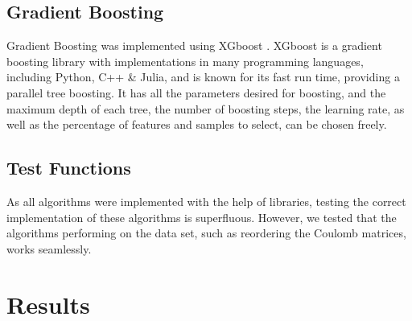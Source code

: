 \documentclass[11pt,a4paper,notitlepage]{article}
\begin{document}
\subsection{Gradient Boosting}
Gradient Boosting was implemented using XGboost \citep{XGboost}. XGboost is a gradient boosting library with implementations in many programming languages, including Python, C++ \& Julia, and is known for its fast run time, providing a parallel tree boosting. It has all the parameters desired for boosting, and the maximum depth of each tree, the number of boosting steps, the learning rate, as well as the percentage of features and samples to select, can be chosen freely.
\subsection{Test Functions}
As all algorithms were implemented with the help of libraries, testing the correct implementation of these algorithms is superfluous. However, we tested that the algorithms performing on the data set, such as reordering the Coulomb matrices, works seamlessly. 
\section{Results}
\end{document}

